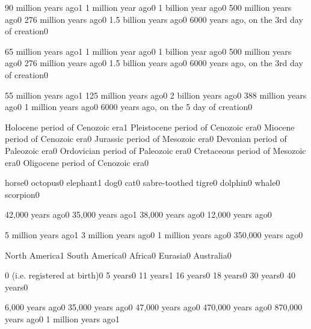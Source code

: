 {90 million years ago}{1}
{1 million year ago}{0}
{1 billion year ago}{0}
{500 million years ago}{0}
{276 million years ago}{0}
{1.5 billion years ago}{0}
{6000 years ago, on the 3rd day of creation}{0}
\qstop

{65 million years ago}{1}
{1 million year ago}{0}
{1 billion year ago}{0}
{500 million years ago}{0}
{276 million years ago}{0}
{1.5 billion years ago}{0}
{6000 years ago, on the 3rd day of creation}{0}
\qstop

{55 million years ago}{1}
{125 million years ago}{0}
{2 billion years ago}{0}
{388 million years ago}{0}
{1 million years ago}{0}
{6000 years ago, on the 5 day of creation}{0}
\qstop


{Holocene period of Cenozoic era}{1}
{Pleistocene period of Cenozoic era}{0}
{Miocene period of Cenozoic era}{0}
{Jurassic period of Mesozoic era}{0}
{Devonian period of Paleozoic era}{0}
{Ordovician period of Paleozoic era}{0}
{Cretaceous period of Mesozoic era}{0}
{Oligocene period of Cenozoic era}{0}
\qstop

{horse}{0}
{octopus}{0}
{elephant}{1}
{dog}{0}
{cat}{0}
{sabre-toothed tigre}{0}
{dolphin}{0}
{whale}{0}
{scorpion}{0}
\qstop

{42,000 years ago}{0}
{35,000 years ago}{1}
{38,000 years ago}{0}
{12,000 years ago}{0}
\qstop

{5 million years ago}{1}
{3 million years ago}{0}
{1 million years ago}{0}
{350,000 years ago}{0}
\qstop

{North America}{1}
{South America}{0}
{Africa}{0}
{Eurasia}{0}
{Australia}{0}
\qstop

{0 (i.e. registered at birth)}{0}
{5 years}{0}
{11 years}{1}
{16 years}{0}
{18 years}{0}
{30 years}{0}
{40 years}{0}
\qstop


{6,000 years ago}{0}
{35,000 years ago}{0}
{47,000 years ago}{0}
{470,000 years ago}{0}
{870,000 years ago}{0}
{1 million years ago}{1}
\qstop

